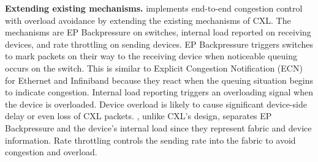 
\noindent \textbf{Extending existing mechanisms.}
%
\aurelia implements end-to-end congestion control with overload avoidance by extending the existing mechanisms of CXL. 
%
The mechanisms are EP Backpressure on switches, internal load reported on receiving devices, and rate throttling on sending devices.
%
%
EP Backpressure triggers switches to mark packets on their way to the receiving device when noticeable queuing occurs on the switch.  
%
This is similar to Explicit Congestion Notification (ECN) for Ethernet and Infiniband because they react when the queuing situation begins to indicate congestion.
%
Internal load reporting triggers an overloading signal when the device is overloaded. 
%
Device overload is likely to cause significant device-side delay or even loss of CXL packets.
%
\aurelia, unlike CXL's design, separates EP Backpressure and the device's internal load since they represent fabric and device information. 
%
%
Rate throttling controls the sending rate into the fabric to avoid congestion and overload. 
%
%

